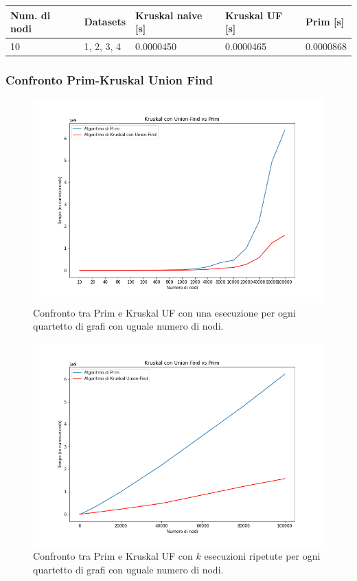 \begin{table}[H]\centering
	\begin{tabular}{l|l|l|l|l}
        \textbf{Num. di nodi} & \textbf{Datasets} & \textbf{Kruskal naive [s]} & \textbf{Kruskal UF [s]} & \textbf{Prim [s]} \\
    \hline
	10 & 1, 2, 3, 4  & 0.0000450 & 0.0000465 & 0.0000868
	\end{tabular}
\end{table}

\subsubsection{Confronto Prim-Kruskal Union Find}


\begin{figure}[H]
	\centering
	\includegraphics[width=1\textwidth]{res/images/graph-no-rep/kruskal_uf_vs_prim_senza_ripetizioni.png}
    \caption{Confronto tra Prim e Kruskal UF con una esecuzione per ogni quartetto di grafi con uguale numero di nodi.}
	\label{fig:krukal_vs_primnr}
\end{figure}


\begin{figure}[H]
	\centering
	\includegraphics[width=1\textwidth]{res/images/graph-complexity/kruskal_uf_vs_prim.png}
	\caption{Confronto tra Prim e Kruskal UF con \(k\) esecuzioni ripetute per ogni quartetto di grafi con uguale numero di nodi.}
    \label{fig:krukal_vs_prim}
\end{figure}

